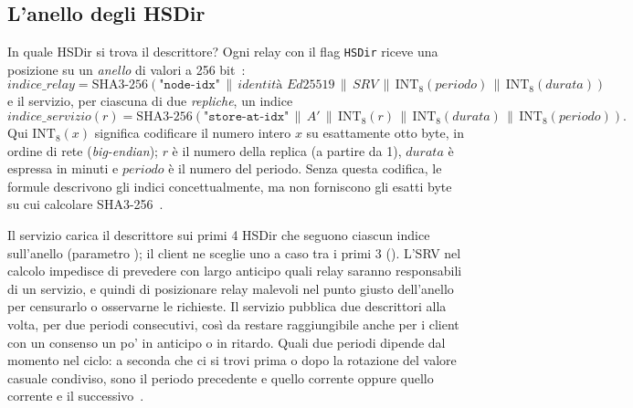 \subsection{L'anello degli HSDir}

In quale HSDir si trova il descrittore? Ogni relay con il flag \texttt{HSDir} riceve una posizione su un \emph{anello} di valori a 256 bit~:
\[
\mathit{indice\_relay} = \mathrm{SHA3\text{-}256}(\texttt{"node-idx"} \,\|\, \textit{identità Ed25519} \,\|\, \mathit{SRV} \,\|\, \mathrm{INT}_8(\mathit{periodo}) \,\|\, \mathrm{INT}_8(\mathit{durata}))
\]
e il servizio, per ciascuna di due \emph{repliche}, un indice
\[
\mathit{indice\_servizio}(r) = \mathrm{SHA3\text{-}256}(\texttt{"store-at-idx"} \,\|\, A' \,\|\, \mathrm{INT}_8(r) \,\|\, \mathrm{INT}_8(\mathit{durata}) \,\|\, \mathrm{INT}_8(\mathit{periodo})).
\]
Qui $\mathrm{INT}_8(x)$ significa codificare il numero intero $x$ su esattamente otto byte,
in ordine di rete (\emph{big-endian}); $r$ è il numero della replica (a partire da 1),
$\mathit{durata}$ è espressa in minuti e $\mathit{periodo}$ è il numero del periodo.
Senza questa codifica, le formule descrivono gli indici concettualmente, ma non
forniscono gli esatti byte su cui calcolare SHA3-256~.

Il servizio carica il descrittore sui primi 4 HSDir che seguono ciascun indice sull'anello (parametro ); il client ne sceglie uno a caso tra i primi 3 (). L'SRV nel calcolo impedisce di prevedere con largo anticipo quali relay saranno responsabili di un servizio, e quindi di posizionare relay malevoli nel punto giusto dell'anello per censurarlo o osservarne le richieste. Il servizio pubblica due descrittori alla volta, per due periodi consecutivi, così da restare raggiungibile anche per i client con un consenso un po' in anticipo o in ritardo. Quali due periodi dipende dal momento nel ciclo: a seconda che ci si trovi prima o dopo la rotazione del valore casuale condiviso, sono il periodo precedente e quello corrente oppure quello corrente e il successivo~.

